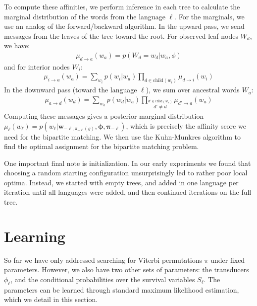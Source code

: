 \documentclass[11pt,a4paper]{article}
\begin{document}
To compute these affinities, we perform
inference in each tree to calculate the marginal distribution of
the words from the language $\ell$. For the marginals, we use an
analog of the forward/backward algorithm. In the upward pass, we
send messages from the leaves of the tree toward the root. For
observed leaf nodes $W_d$, we have:
\begin{equation*}
  \begin{split}
    \mu_{d\to a}(w_a) = p(W_d = w_d|w_a,\phi)
   \end{split}
 \end{equation*}
and for interior nodes $W_i$:
\begin{equation}
  \label{eqn:summing}
  \begin{split}
    \mu_{i\to a}(w_a) = \sum_{w_i} p(w_i|w_a) \prod_{d \in \mathrm{child}(w_i)} \mu_{d \to i}(w_i) 
  \end{split}
\end{equation}
In the downward pass (toward the language $\ell$), we sum over ancestral words $W_a$:
\begin{equation*}
  \begin{split}
    \mu_{a\to d}(w_d) = \sum_{w_a} p(w_d|w_a) \prod_{\stackrel{d' \in \mathrm{child}(w_a)}{d' \neq d}} \mu_{d' \to a}(w_a) 
  \end{split}
\end{equation*}
Computing these messages gives a posterior marginal distribution
$\mu_\ell(w_\ell) = p(w_\ell|\mathbf w_{-\ell,\pi_{-\ell}(g)},\mathbf \phi,\mathbf\pi_{-\ell})$,
which is precisely the affinity score
we need for the bipartite matching. We then use the Kuhn-Munkres
algorithm \cite{Kuhn1955} to find the optimal assignment for the
bipartite matching problem.

One important final note is initialization. In our early experiments
we found that choosing a random starting configuration unsurprisingly led
to rather poor local optima. Instead, we started with empty trees,
and added in one language per iteration until all languages were
added, and then continued iterations on the full tree.

\section{Learning}

So far we have only addressed searching for Viterbi permutations
$\pi$ under fixed parameters. However, we also have two other sets
of parameters: the transducers $\phi_\ell$, and the conditional probabilities
over the survival variables $S_\ell$. The parameters can be learned
through standard maximum likelihood estimation, which we detail in
this section.
\end{document}
